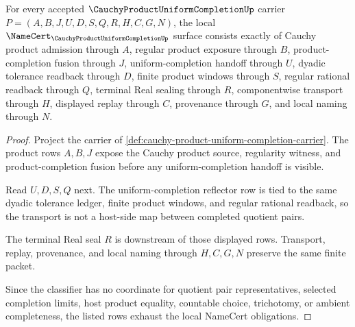 \begin{theorem}
\label{thm:cauchy-product-uniform-completion-obligations}
For every accepted $\CauchyProductUniformCompletionUp$ carrier $P=(A,B,J,U,D,S,Q,R,H,C,G,N)$, the local $\NameCert_{\CauchyProductUniformCompletionUp}$ surface consists exactly of Cauchy product admission through $A$, regular product exposure through $B$, product-completion fusion through $J$, uniform-completion handoff through $U$, dyadic tolerance readback through $D$, finite product windows through $S$, regular rational readback through $Q$, terminal Real sealing through $R$, componentwise transport through $H$, displayed replay through $C$, provenance through $G$, and local naming through $N$.
\end{theorem}
\begin{proof}
Project the carrier of \autoref{def:cauchy-product-uniform-completion-carrier}. The product rows $A,B,J$ expose the Cauchy product source, regularity witness, and product-completion fusion before any uniform-completion handoff is visible.

Read $U,D,S,Q$ next. The uniform-completion reflector row is tied to the same dyadic tolerance ledger, finite product windows, and regular rational readback, so the transport is not a host-side map between completed quotient pairs.

The terminal Real seal $R$ is downstream of those displayed rows. Transport, replay, provenance, and local naming through $H,C,G,N$ preserve the same finite packet.

Since the classifier has no coordinate for quotient pair representatives, selected completion limits, host product equality, countable choice, trichotomy, or ambient completeness, the listed rows exhaust the local NameCert obligations.
\end{proof}

